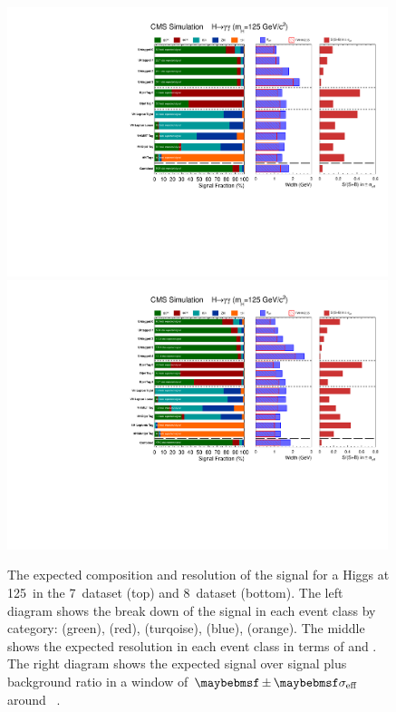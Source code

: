 \begin{figure}
  \begin{center}
    \includegraphics[width=0.99\textwidth]{ch5_anal_and_results/plots/thesis_signal_7TeV/signalComposition.pdf} \\
    \includegraphics[width=0.99\textwidth]{ch5_anal_and_results/plots/thesis_signal_8TeV/signalComposition.pdf}
    \caption{The expected composition and resolution of the signal for a \SM Higgs at 125~\GeV in the 7~\TeV dataset (top) and 8~\TeV dataset (bottom). The left diagram shows the break down of the signal in each event class by category: \ggH (green), \VBF (red), \WH (turqoise), \ZH (blue), \ttH (orange). The middle shows the expected resolution in each event class in terms of \sigeff and \sigFW. The right diagram shows the expected signal over signal plus background ratio in a window of $\pm\sigeff$ around ~\GeV.}
    \label{fig:signal_composition}
  \end{center}
\end{figure}
  

